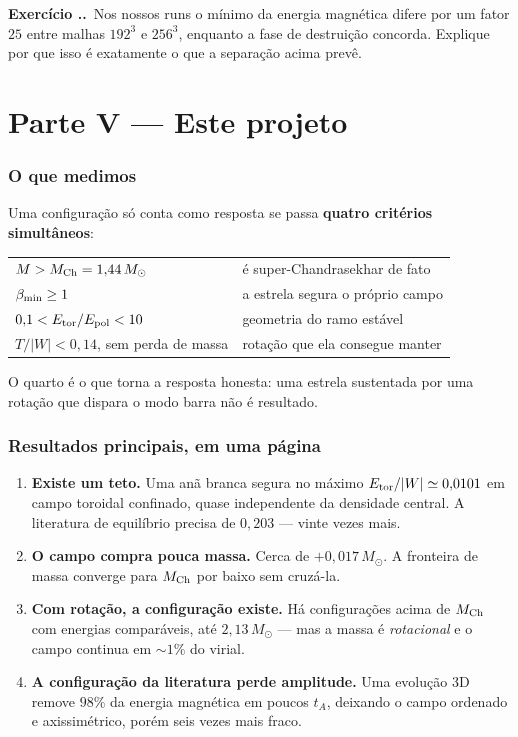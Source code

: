 \documentclass[11pt,a4paper]{article}
\newcommand{\Msun}{M_\odot}
\newcommand{\Mch}{M_{\rm Ch}}
\newcounter{exerc}[section]
\newcommand{\ex}[1]{\refstepcounter{exerc}%
  \medskip\noindent\textbf{Exercício \thesection.\theexerc.}\ #1\medskip}
\begin{document}
\ex{Nos nossos runs o mínimo da energia magnética difere por um fator $25$
entre malhas $192^3$ e $256^3$, enquanto a fase de destruição concorda. Explique
por que isso é exatamente o que a separação acima prevê.}

\part*{Parte V --- Este projeto}

\section{O que medimos}

Uma configuração só conta como resposta se passa \textbf{quatro critérios
simultâneos}:

\begin{center}
\begin{tabular}{ll}
\hline
$M > \Mch = 1{,}44\,\Msun$ & é super-Chandrasekhar de fato \\
$\beta_{\rm min} \ge 1$ & a estrela segura o próprio campo \\
$0{,}1 < E_{\rm tor}/E_{\rm pol} < 10$ & geometria do ramo estável \\
$T/|W| < 0{,}14$, sem perda de massa & rotação que ela consegue manter \\
\hline
\end{tabular}
\end{center}

O quarto é o que torna a resposta honesta: uma estrela sustentada por uma
rotação que dispara o modo barra não é resultado.

\section{Resultados principais, em uma página}

\begin{enumerate}
\item \textbf{Existe um teto.} Uma anã branca segura no máximo
      $E_{\rm tor}/|W| \simeq 0{,}0101$ em campo toroidal confinado, quase
      independente da densidade central. A literatura de equilíbrio precisa de
      $0{,}203$ --- vinte vezes mais.
\item \textbf{O campo compra pouca massa.} Cerca de $+0{,}017\,\Msun$. A
      fronteira de massa converge para $\Mch$ por baixo sem cruzá-la.
\item \textbf{Com rotação, a configuração existe.} Há configurações acima de
      $\Mch$ com energias comparáveis, até $2{,}13\,\Msun$ --- mas a massa é
      \emph{rotacional} e o campo continua em $\sim1\%$ do virial.
\item \textbf{A configuração da literatura perde amplitude.} Uma evolução 3D
      remove $98\%$ da energia magnética em poucos $t_A$, deixando o campo
      ordenado e axissimétrico, porém seis vezes mais fraco.
\end{enumerate}
\end{document}
